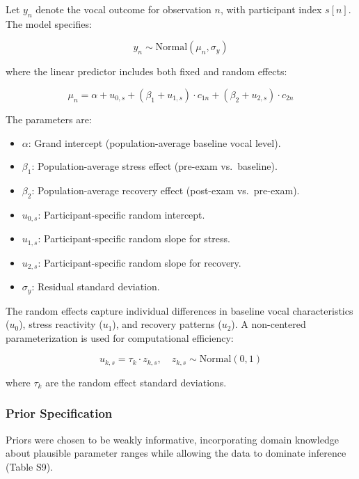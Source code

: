 \documentclass[
  english,
  man,floatsintext]{apa6}
\providecommand{\tightlist}{%
  \setlength{\itemsep}{0pt}\setlength{\parskip}{0pt}}
\begin{document}
Let \(y_n\) denote the vocal outcome for observation \(n\), with participant index \(s[n]\). The model specifies:

\[
y_n \sim \text{Normal}(\mu_n, \sigma_y)
\]

where the linear predictor includes both fixed and random effects:

\[
\mu_n = \alpha + u_{0,s} + (\beta_1 + u_{1,s}) \cdot c_{1n} + (\beta_2 + u_{2,s}) \cdot c_{2n}
\]

The parameters are:

\begin{itemize}
\tightlist
\item
  \(\alpha\): Grand intercept (population-average baseline vocal level).
\item
  \(\beta_1\): Population-average stress effect (pre-exam vs.~baseline).
\item
  \(\beta_2\): Population-average recovery effect (post-exam vs.~pre-exam).
\item
  \(u_{0,s}\): Participant-specific random intercept.
\item
  \(u_{1,s}\): Participant-specific random slope for stress.
\item
  \(u_{2,s}\): Participant-specific random slope for recovery.
\item
  \(\sigma_y\): Residual standard deviation.
\end{itemize}

The random effects capture individual differences in baseline vocal characteristics (\(u_0\)), stress reactivity (\(u_1\)), and recovery patterns (\(u_2\)). A non-centered parameterization is used for computational efficiency:

\[
u_{k,s} = \tau_k \cdot z_{k,s}, \quad z_{k,s} \sim \text{Normal}(0, 1)
\]

where \(\tau_k\) are the random effect standard deviations.

\subsubsection{Prior Specification}\label{prior-specification}

Priors were chosen to be weakly informative, incorporating domain knowledge about plausible parameter ranges while allowing the data to dominate inference (Table S9).
\end{document}
